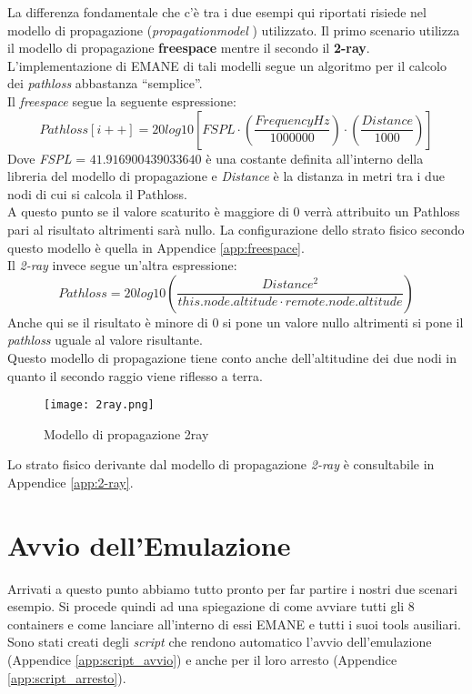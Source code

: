 La differenza fondamentale che c'è tra i due esempi qui riportati risiede nel modello di propagazione (\textit{propagationmodel} \cite{propagationmodel}) utilizzato. Il primo scenario utilizza il modello di propagazione \textbf{freespace} mentre il secondo il \textbf{2-ray}. L'implementazione di EMANE di tali modelli segue un algoritmo per il calcolo dei \textit{pathloss} abbastanza ``semplice''. \\
Il \textit{freespace} segue la seguente espressione: 
\begin{equation*}
Pathloss[i++] = 20 log10[FSPL\cdot(\frac{FrequencyHz}{1000000})\cdot(\frac{Distance}{1000})]
\end{equation*} 
\noindent
Dove \textit{FSPL} = $41.916900439033640$ è una costante definita all'interno della libreria del modello di propagazione e \textit{Distance} è la distanza in metri tra i due nodi di cui si calcola il Pathloss. \\
A questo punto se il valore scaturito è maggiore di $0$ verrà attribuito un Pathloss pari al risultato altrimenti sarà nullo. La configurazione dello strato fisico secondo questo modello è quella in Appendice \ref{app:freespace}. \\

Il \textit{2-ray} invece segue un'altra espressione:
\begin{equation*}
Pathloss=20 log10(\frac{Distance^2}{this.node.altitude \cdot remote.node.altitude})
\end{equation*} 
\noindent
Anche qui se il risultato è minore di $0$ si pone un valore nullo altrimenti si pone il \textit{pathloss} uguale al valore risultante. \\
Questo modello di propagazione tiene conto anche dell'altitudine dei due nodi in quanto il secondo raggio viene riflesso a terra.

\begin{figure}[H]
	\centering
	\texttt{[image: 2ray.png]}
	\caption{Modello di propagazione 2ray}
	\label{fig:2ray}
\end{figure}
\noindent
Lo strato fisico derivante dal modello di propagazione \textit{2-ray} è consultabile in Appendice \ref{app:2-ray}. \\

\section{Avvio dell'Emulazione}

Arrivati a questo punto abbiamo tutto pronto per far partire i nostri due scenari esempio. Si procede quindi ad una spiegazione di come avviare tutti gli $8$ containers e come lanciare all'interno di essi EMANE e tutti i suoi tools ausiliari. \\
Sono stati creati degli \textit{script} che rendono automatico l'avvio dell'emulazione (Appendice \ref{app:script_avvio}) e anche per il loro arresto (Appendice \ref{app:script_arresto}).

